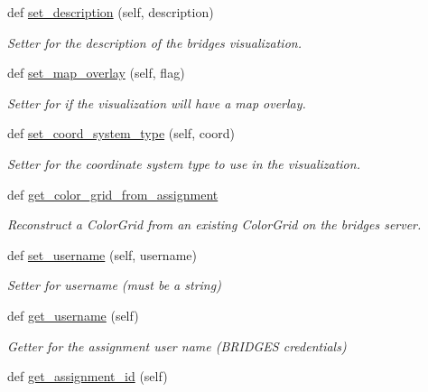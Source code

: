 \begin{DoxyCompactItemize}
def \hyperlink{classbridges_1_1bridges_1_1_bridges_aba86088c031b505bbe88dbc530bf1331}{set\+\_\+description} (self, description)
\begin{DoxyCompactList}\small\item\em Setter for the description of the bridges visualization. \end{DoxyCompactList}\item 
def \hyperlink{classbridges_1_1bridges_1_1_bridges_ae9ed34b5878d9d120949da0b7e4d2911}{set\+\_\+map\+\_\+overlay} (self, flag)
\begin{DoxyCompactList}\small\item\em Setter for if the visualization will have a map overlay. \end{DoxyCompactList}\item 
def \hyperlink{classbridges_1_1bridges_1_1_bridges_a6bc905490b1995234f88f47af9aa8a17}{set\+\_\+coord\+\_\+system\+\_\+type} (self, coord)
\begin{DoxyCompactList}\small\item\em Setter for the coordinate system type to use in the visualization. \end{DoxyCompactList}\item 
def \hyperlink{classbridges_1_1bridges_1_1_bridges_a11c2be346fba56589955894c5f84747d}{get\+\_\+color\+\_\+grid\+\_\+from\+\_\+assignment}
\begin{DoxyCompactList}\small\item\em Reconstruct a Color\+Grid from an existing Color\+Grid on the bridges server. \end{DoxyCompactList}\item 
def \hyperlink{classbridges_1_1bridges_1_1_bridges_a3f97735d336faf40585e99362d64a3ee}{set\+\_\+username} (self, username)
\begin{DoxyCompactList}\small\item\em Setter for username (must be a string) \end{DoxyCompactList}\item 
def \hyperlink{classbridges_1_1bridges_1_1_bridges_abf6fdb19db336c2ed14987fdd89d65fe}{get\+\_\+username} (self)
\begin{DoxyCompactList}\small\item\em Getter for the assignment user name (B\+R\+I\+D\+G\+ES credentials) \end{DoxyCompactList}\item 
def \hyperlink{classbridges_1_1bridges_1_1_bridges_a94f39f11368031ad33800aac0bac2f7d}{get\+\_\+assignment\+\_\+id} (self)

\end{DoxyCompactItemize}

